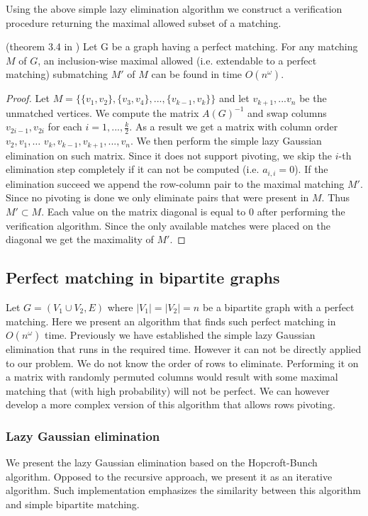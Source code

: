 Using the above simple lazy elimination algorithm we construct a verification procedure returning the maximal allowed subset of a matching.
\begin{theorem}(theorem 3.4 in \cite{mucha})
Let G be a graph having a perfect matching. For any matching $M$ of $G$, an inclusion-wise maximal allowed (i.e. extendable to a perfect matching) submatching $M'$ of $M$ can be found in time $O(n^\omega)$.
\end{theorem}
\begin{proof}
Let $M = \{\{v_1,v_2\},\{v_3,v_4\},...,\{v_{k-1},v_k\}\}$ and let $v_{k+1},...v_n$ be the unmatched vertices.
We compute the matrix $A(G)^{-1}$ and swap columns $v_{2i-1}, v_{2i}$ for each $i=1,...,\frac{k}{2}$.
As a result we get a matrix with column order $v_2, v_1, \ldots$ $v_k, v_{k-1}, v_{k+1}, ..., v_n$.
We then perform the simple lazy Gaussian elimination on such matrix.
Since it does not support pivoting, we skip the $i$-th elimination step completely if it can not be computed (i.e. $a_{i,i}=0$).
If the elimination succeed we append the row-column pair to the maximal matching $M'$.
Since no pivoting is done we only eliminate pairs that were present in $M$. Thus $M' \subset M$.
Each value on the matrix diagonal is equal to $0$ after performing the verification algorithm.
Since the only available matches were placed on the diagonal we get the maximality of $M'$.
\end{proof}

\subsection{Perfect matching in bipartite graphs}
Let $G=(V_1\cup V_2,E)$ where $|V_1|=|V_2|=n$ be a bipartite graph with a perfect matching.
Here we present an algorithm that finds such perfect matching in $O(n^\omega)$ time.
Previously we have established the simple lazy Gaussian elimination that runs in the required time.
However it can not be directly applied to our problem.
We do not know the order of rows to eliminate.
Performing it on a matrix with randomly permuted columns would result with some maximal matching that (with high probability) will not be perfect.
We can however develop a more complex version of this algorithm that allows rows pivoting.

\subsubsection{Lazy Gaussian elimination}
We present the lazy Gaussian elimination based on the Hopcroft-Bunch \cite{hopcroft-bunch} algorithm. Opposed to the recursive approach, we present it as an iterative algorithm. Such implementation emphasizes the similarity between this algorithm and simple bipartite matching.

